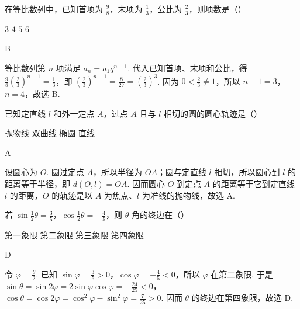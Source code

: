 \begin{problem}

在等比数列中，已知首项为 \(\frac{9}{8}\)，末项为 \(\frac{1}{3}\)，公比为 \(\frac{2}{3}\)，则项数是（\quad）

\choices
    {\(3\)}
    {\(4\)}
    {\(5\)}
    {\(6\)}
\end{problem}

\begin{answer}
B
\end{answer}

\begin{solution}
等比数列第 \(n\) 项满足 \(a_n=a_1q^{n-1}\). 代入已知首项、末项和公比，得 \(\frac{9}{8}\left(\frac{2}{3}\right)^{n-1}=\frac13\)，即 \(\left(\frac23\right)^{n-1}=\frac{8}{27}=\left(\frac23\right)^3\). 因为 \(0<\frac23\neq1\)，所以 \(n-1=3\)，\(n=4\)，故选 B.
\end{solution}

\begin{problem}

已知定直线 \(l\) 和外一定点 \(A\)，过点 \(A\) 且与 \(l\) 相切的圆的圆心轨迹是（\quad）

\choices
    {抛物线}
    {双曲线}
    {椭圆}
    {直线}
\end{problem}

\begin{answer}
A
\end{answer}

\begin{solution}
设圆心为 \(O\). 圆过定点 \(A\)，所以半径为 \(OA\)；圆与定直线 \(l\) 相切，所以圆心到 \(l\) 的距离等于半径，即 \(d(O,l)=OA\). 因而圆心 \(O\) 到定点 \(A\) 的距离等于它到定直线 \(l\) 的距离，\(O\) 的轨迹是以 \(A\) 为焦点、\(l\) 为准线的抛物线，故选 A.
\end{solution}

\begin{problem}

若 \(\sin \frac{1}{2}\theta = \frac{3}{5}\)，\(\cos \frac{1}{2}\theta = -\frac{4}{5}\)，则 \(\theta\) 角的终边在（\quad）

\choices
    {第一象限}
    {第二象限}
    {第三象限}
    {第四象限}
\end{problem}

\begin{answer}
D
\end{answer}

\begin{solution}
令 \(\varphi=\frac{\theta}{2}\). 已知 \(\sin\varphi=\frac35>0\)，\(\cos\varphi=-\frac45<0\)，所以 \(\varphi\) 在第二象限. 于是 \(\sin\theta=\sin 2\varphi=2\sin\varphi\cos\varphi=-\frac{24}{25}<0\)，\(\cos\theta=\cos 2\varphi=\cos^{2}\varphi-\sin^{2}\varphi=\frac{7}{25}>0\). 因而 \(\theta\) 的终边在第四象限，故选 D.
\end{solution}

